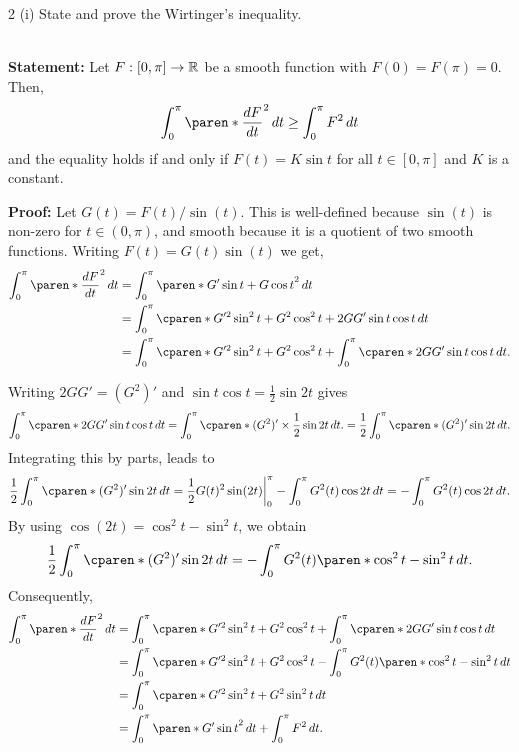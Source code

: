 \documentclass[11pt]{penrose}
\begin{document}
\begin{problem}{2 (i)}
    State and prove the Wirtinger's inequality.

    \solution\\
    \textbf{Statement:} Let $F : [0, \pi] \to \mathbb{R}$ be a smooth function with $F(0) = F(\pi) = 0$. Then,
        \begin{equation*}
            \int_{0}^{\pi} \paren*{\frac{dF}{dt}}^2 \,dt \geq \int_{0}^{\pi} F^2 \,dt
        \end{equation*}
        and the equality holds if and only if $F(t) = K \sin t$ for all $t \in [0, \pi]$ and $K$ is a constant.
    
    \textbf{Proof:} Let $G(t) = F(t) / \sin(t)$. This is well-defined because $\sin(t)$ is non-zero for $t \in (0, \pi)$, and smooth because it is a quotient of two smooth functions. Writing $F(t) = G(t) \sin(t)$ we get,
    \begin{align*}
        \int_{0}^{\pi} \paren*{\frac{dF}{dt}}^2 \,dt
        &= \int_{0}^{\pi} \paren*{ G' \sin t + G \cos t }^2 \,dt\\
        &= \int_{0}^{\pi} \cparen*{G'^2 \sin^2 t + G^2 \cos^2 t + 2 G G' \sin t \cos t} \,dt\\
        &= \int_{0}^{\pi} \cparen*{G'^2 \sin^2 t + G^2 \cos^2 t} + \int_{0}^{\pi} \cparen*{2 G G' \sin t \cos t} \,dt.
    \end{align*}

    Writing $2 G G' = (G^2)'$ and $\sin t \cos t = \frac{1}{2} \sin 2t$ gives
    \begin{equation*}
        \int_{0}^{\pi} \cparen*{2 G G' \sin t \cos t} \,dt
        = \int_{0}^{\pi} \cparen*{(G^2)' \times \frac{1}{2} \sin 2t} \,dt.
        = \frac{1}{2} \int_{0}^{\pi} \cparen*{(G^2)' \sin 2t} \,dt.
    \end{equation*}
    Integrating this by parts, leads to
    \begin{equation*}
        \frac{1}{2} \int_{0}^{\pi} \cparen*{(G^2)' \sin 2t} \,dt
        = \bigg. \frac{1}{2} G(t)^2  \sin (2t) \bigg|_{0}^{\pi} - \int_{0}^{\pi} G^2(t) \cos 2t \,dt
        = - \int_{0}^{\pi} G^2(t) \cos 2t \,dt.
    \end{equation*}
    By using $\cos(2t) = \cos^2 t - \sin^2 t$, we obtain
    \begin{equation*}
        \frac{1}{2} \int_{0}^{\pi} \cparen*{(G^2)' \sin 2t} \,dt
        = -\int_{0}^{\pi} G^2(t) \paren*{\cos^2 t - \sin^2 t} \,dt.
    \end{equation*}
    Consequently,
    \begin{align*}
        \int_{0}^{\pi} \paren*{\frac{dF}{dt}}^2 \,dt
        &= \int_{0}^{\pi} \cparen*{G'^2 \sin^2 t + G^2 \cos^2 t} + \int_{0}^{\pi} \cparen*{2 G G' \sin t \cos t} \,dt\\
        &= \int_{0}^{\pi} \cparen*{G'^2 \sin^2 t + G^2 \cos^2 t} - \int_{0}^{\pi} G^2(t) \paren*{\cos^2 t - \sin^2 t} \,dt\\
        &= \int_{0}^{\pi} \cparen*{G'^2 \sin^2 t + G^2 \sin^2 t} \,dt\\
        &= \int_{0}^{\pi} \paren*{G' \sin t}^2 \,dt + \int_{0}^{\pi} F^2 \,dt.
    \end{align*}


\end{problem}
\end{document}
